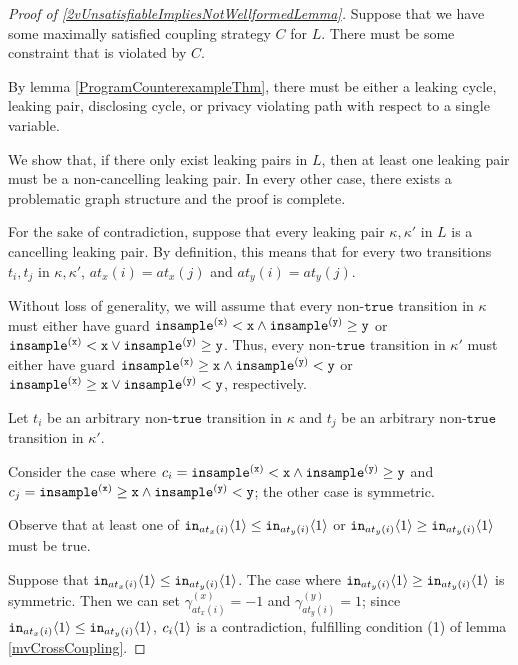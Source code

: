 \begin{proof}[Proof of \ref{2vUnsatisfiableImpliesNotWellformedLemma}]
    Suppose that we have some maximally satisfied coupling strategy $C$ for $L$. There must be some constraint that is violated by $C$.

    By lemma \ref{ProgramCounterexampleThm}, there must be either a leaking cycle, leaking pair, disclosing cycle, or privacy violating path with respect to a single variable. 

    We show that, if there only exist leaking pairs in $L$, then at least one leaking pair must be a non-cancelling leaking pair. In every other case, there exists a problematic graph structure and the proof is complete. 

    For the sake of contradiction, suppose that every leaking pair $\kappa, \kappa'$ in $L$ is a cancelling leaking pair. By definition, this means that for every two transitions $t_i, t_j$ in $\kappa, \kappa'$, $at_x(i) = at_x(j)$ and $at_y(i) = at_y(j)$. 

    Without loss of generality, we will assume that every non-$\texttt{true}$ transition in $\kappa$ must either have guard $\mvlguard[\texttt{x}]\land\mvgguard[\texttt{y}]$ or $\mvlguard[\texttt{x}]\lor\mvgguard[\texttt{y}]$. Thus, every non-$\texttt{true}$ transition in $\kappa'$ must either have guard $\mvgguard[\texttt{x}]\land\mvlguard[\texttt{y}]$ or $\mvgguard[\texttt{x}]\lor\mvlguard[\texttt{y}]$, respectively. 

    Let $t_i$ be an arbitrary non-$\texttt{true}$ transition in $\kappa$ and $t_j$ be an arbitrary non-$\texttt{true}$ transition in $\kappa'$.

    Consider the case where $c_i = \mvlguard[\texttt{x}]\land\mvgguard[\texttt{y}]$ and $c_j = \mvgguard[\texttt{x}]\land\mvlguard[\texttt{y}]$; the other case is symmetric.

    Observe that at least one of $\texttt{in}_{at_x(i)}\brangle{1}\leq \texttt{in}_{at_y(i)}\brangle{1}$ or $\texttt{in}_{at_y(i)}\brangle{1}\geq \texttt{in}_{at_y(i)}\brangle{1}$ must be true.
    
    Suppose that $\texttt{in}_{at_x(i)}\brangle{1}\leq \texttt{in}_{at_y(i)}\brangle{1}$. The case where $\texttt{in}_{at_y(i)}\brangle{1}\geq \texttt{in}_{at_y(i)}\brangle{1}$ is symmetric. 
    Then we can set $\gamma_{at_x(i)}^{(x)} = -1$ and $\gamma_{at_y(i)}^{(y)}=1$; since $\texttt{in}_{at_x(i)}\brangle{1}\leq \texttt{in}_{at_y(i)}\brangle{1}$, $c_i\brangle{1}$ is a contradiction, fulfilling condition (1) of lemma \ref{mvCrossCoupling}. 


\end{proof}
